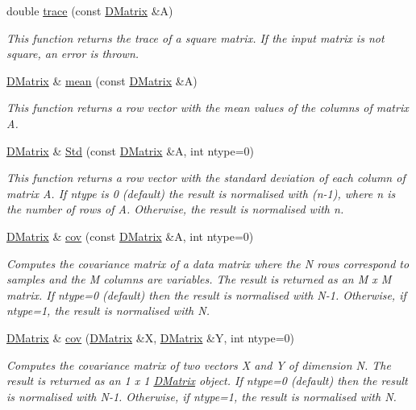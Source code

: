 \begin{DoxyCompactItemize}
double \hyperlink{classDMatrix_a25e61176fea3c03f41f8a4524a3a08b0}{trace} (const \hyperlink{classDMatrix}{DMatrix} \&A)
\begin{DoxyCompactList}\small\item\em This function returns the trace of a square matrix. If the input matrix is not square, an error is thrown. \item\end{DoxyCompactList}\item 
\hyperlink{classDMatrix}{DMatrix} \& \hyperlink{classDMatrix_a210dc48c90f3be6b71e35784b3625633}{mean} (const \hyperlink{classDMatrix}{DMatrix} \&A)
\begin{DoxyCompactList}\small\item\em This function returns a row vector with the mean values of the columns of matrix A. \item\end{DoxyCompactList}\item 
\hyperlink{classDMatrix}{DMatrix} \& \hyperlink{classDMatrix_a7c163993971bbf77eb42200e73061eee}{Std} (const \hyperlink{classDMatrix}{DMatrix} \&A, int ntype=0)
\begin{DoxyCompactList}\small\item\em This function returns a row vector with the standard deviation of each column of matrix A. If ntype is 0 (default) the result is normalised with (n-\/1), where n is the number of rows of A. Otherwise, the result is normalised with n. \item\end{DoxyCompactList}\item 
\hyperlink{classDMatrix}{DMatrix} \& \hyperlink{classDMatrix_a261380c58f5a12770bdecf4c0d57eddb}{cov} (const \hyperlink{classDMatrix}{DMatrix} \&A, int ntype=0)
\begin{DoxyCompactList}\small\item\em Computes the covariance matrix of a data matrix where the N rows correspond to samples and the M columns are variables. The result is returned as an M x M matrix. If ntype=0 (default) then the result is normalised with N-\/1. Otherwise, if ntype=1, the result is normalised with N. \item\end{DoxyCompactList}\item 
\hyperlink{classDMatrix}{DMatrix} \& \hyperlink{classDMatrix_ac4da4357ee63d240053aebfc8d687784}{cov} (\hyperlink{classDMatrix}{DMatrix} \&X, \hyperlink{classDMatrix}{DMatrix} \&Y, int ntype=0)
\begin{DoxyCompactList}\small\item\em Computes the covariance matrix of two vectors X and Y of dimension N. The result is returned as an 1 x 1 \hyperlink{classDMatrix}{DMatrix} object. If ntype=0 (default) then the result is normalised with N-\/1. Otherwise, if ntype=1, the result is normalised with N. \item\end{DoxyCompactList}\item 

\end{DoxyCompactItemize}
